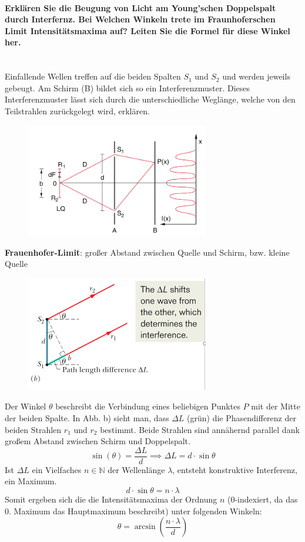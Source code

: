 \documentclass[a4paper, 11pt, ngerman, parskip=half-]{scrartcl}
\newcommand{\myparagraph}[1]{\paragraph{#1}\mbox{}\\}
\begin{document}
\myparagraph{Erklären Sie die Beugung von Licht am Young'schen Doppelspalt durch Interfernz. Bei
    Welchen Winkeln trete im Fraunhoferschen Limit Intensitätsmaxima auf? Leiten Sie die
    Formel für diese Winkel her.}

Einfallende Wellen treffen auf die beiden Spalten $S_1$ und $S_2$ und werden jeweils gebeugt. Am Schirm (B) bildet sich so ein Interferenzmuster.
Dieses Interferenzmuster lässt sich durch die unterschiedliche Weglänge, welche von den Teilstrahlen zurückgelegt wird, erklären.
\begin{figure}[H]
    \centering
    \includegraphics[width=8cm]{image/18_Interferenz/Youngscher_Doppelspalt.png}
\end{figure}
\textbf{Frauenhofer-Limit}: großer Abstand zwischen Quelle und Schirm, bzw. kleine Quelle
\begin{figure}[H]
    \centering
    \includegraphics[width=8cm]{image/18_Interferenz/Doppelspalt_Wegunterschied.png}
\end{figure}
Der Winkel $\theta$ beschreibt die Verbindung eines beliebigen Punktes $P$ mit der Mitte der beiden Spalte.
In Abb. b) sieht man, dass $\Delta L$ (grün) die Phasendifferenz der beiden Strahlen $r_1$ und $r_2$ bestimmt.
Beide Strahlen sind annähernd parallel dank großem Abstand zwischen Schirm und Doppelspalt.
%
\[\sin(\theta) = \frac{\Delta L}{d} \implies \Delta L = d \cdot \sin \theta\]
%
Ist $\Delta L$ ein Vielfaches $n \in \mathbb{N}$ der Wellenlänge $\lambda$, entsteht konstruktive Interferenz, ein Maximum.
\[d \cdot \sin \theta = n \cdot \lambda\]
Somit ergeben sich die die Intensitätsmaxima der Ordnung $n$ (0-indexiert, da das 0. Maximum das Hauptmaximum beschreibt) unter folgenden Winkeln:
\begin{equation}
    \label{eq:Intensitaetsmaxima_Young_Doppelspalt}
    \theta = \arcsin(\frac{n \cdot \lambda}{d})
\end{equation}
\end{document}
